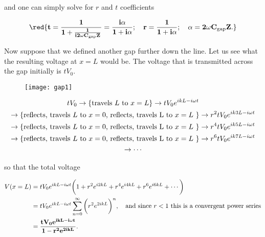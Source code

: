 \noindent and one can simply solve for $ r $ and $ t $ coefficients

 \begin{equation}\label{tLinert}
   \mathbf{\red{t= \frac{1}{1+\frac{1}{i2\omega C_\text{gap}Z}} = \frac{i\alpha}{1+i\alpha};\quad	 r = \frac{1}{1+i\alpha};\quad \alpha = 2\omega C_\text{gap}Z.}}
 \end{equation}

 Now suppose that we defined another gap further down the line. Let us
 see what the resulting voltage at $  x=L $ would be. The voltage that
 is transmitted across the gap initially is $ tV_0 $.

 \begin{figure}[h]
   \centering%
   \texttt{[image: gap1]}
 \end{figure}

 \begin{multline}\label{tlineMUltiple}
   tV_0 \rightarrow \left\lbrace \text{travels $ L $ to
       $    x=L    $}\right\rbrace    \rightarrow   tV_0e^{ikL-i\omega    t}    \\
   \rightarrow\left\lbrace \text{reflects, travels  $ L $ to  $ x=0 $,
       reflects,  travels  L  to  $  x=L  $  }\right\rbrace\rightarrow
   r^2tV_0e^{ik3L-i\omega t}\\ \rightarrow\left\lbrace \text{reflects,
       travels $ L $ to $ x=0 $, reflects, travels L to $ x=L $
     }\right\rbrace\rightarrow     r^4tV_0e^{ik5L-i\omega      t}     \\
   \rightarrow\left\lbrace \text{reflects, travels  $ L $ to  $ x=0 $,
       reflects,  travels  L  to  $  x=L  $  }\right\rbrace\rightarrow
   r^6tV_0e^{ik7L-i\omega t} \\ \rightarrow\cdots
 \end{multline}

 \noindent so that the total voltage

 \begin{equation}\label{tlineTotalVoltage}
   \begin{aligned}
     V(x=L) & = tV_0e^{ikL-i\omega t}\bigg(1+r^2e^{i2kL}+r^4e^{i4kL}+r^6e^{i6kL}+\cdots\bigg)\\
     & = tV_0e^{ikL-i\omega t}\sum_{n=0}^{\infty}\bigg(r^2e^{2ikL}\bigg)^n, \quad\text{and since $ r<1 $ this is a convergent power series}\\
     & = \mathbf{\frac{tV_0e^{ikL-i\omega t}}{1-r^2e^{2ikL}}.}
   \end{aligned}
 \end{equation}

